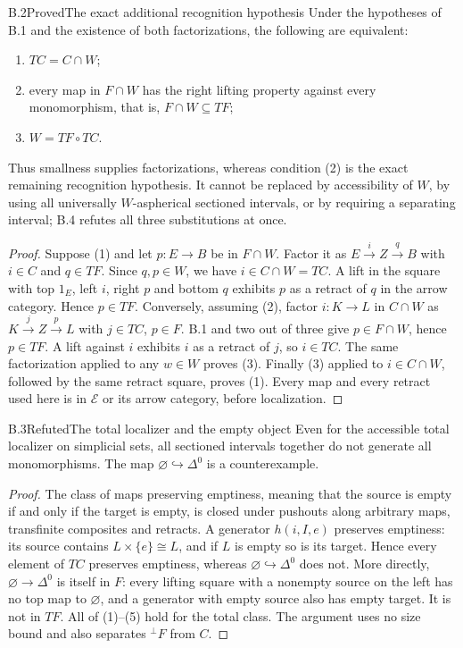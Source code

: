 \begin{claim}{B.2}{Proved}{The exact additional recognition hypothesis}\label{B2}
Under the hypotheses of B.1 and the existence of both factorizations, the
following are equivalent:
\begin{enumerate}
\item $TC=C\cap W$;
\item every map in $F\cap W$ has the right lifting property against every
monomorphism, that is, $F\cap W\subseteq TF$;
\item $W=TF\circ TC$.
\end{enumerate}
Thus smallness supplies factorizations, whereas condition (2) is the exact
remaining recognition hypothesis.  It cannot be replaced by accessibility
of $W$, by using all universally $W$-aspherical sectioned intervals, or by
requiring a separating interval; B.4 refutes all three substitutions at once.
\end{claim}
\begin{proof}
Suppose (1) and let $p:E\to B$ be in $F\cap W$.  Factor it as
$E\xrightarrow{i}Z\xrightarrow{q}B$ with $i\in C$ and $q\in TF$.
Since $q,p\in W$, we have $i\in C\cap W=TC$.
A lift in the square with top $1_E$, left $i$, right $p$ and bottom $q$
exhibits $p$ as a retract of $q$ in the arrow category.  Hence $p\in TF$.
Conversely, assuming (2), factor $i:K\to L$ in $C\cap W$ as
$K\xrightarrow{j}Z\xrightarrow{p}L$ with $j\in TC$, $p\in F$.
B.1 and two out of three give $p\in F\cap W$, hence $p\in TF$.
A lift against $i$ exhibits $i$ as a retract of $j$, so $i\in TC$.
The same factorization applied to any $w\in W$ proves (3).
Finally (3) applied to $i\in C\cap W$, followed by the same retract square,
proves (1).  Every map and every retract used here is in $\mathscr E$ or its
arrow category, before localization.
\end{proof}

\begin{claim}{B.3}{Refuted}{The total localizer and the empty object}\label{B3}
Even for the accessible total localizer on simplicial sets, all sectioned
intervals together do not generate all monomorphisms.  The map
$\varnothing\hookrightarrow\Delta^0$ is a counterexample.
\end{claim}
\begin{proof}
The class of maps preserving emptiness, meaning that the source is empty
if and only if the target is empty, is closed under pushouts along arbitrary
maps, transfinite composites and retracts.  A generator $h(i,I,e)$ preserves
emptiness: its source contains $L\times\{e\}\cong L$, and if $L$ is empty
so is its target.  Hence every element of $TC$ preserves emptiness, whereas
$\varnothing\hookrightarrow\Delta^0$ does not.  More directly,
$\varnothing\to\Delta^0$ is itself in $F$: every lifting square with a
nonempty source on the left has no top map to $\varnothing$, and a generator
with empty source also has empty target.  It is not in $TF$.
All of (1)--(5) hold for the total class.  The argument uses no size bound and
also separates ${}^{\perp}F$ from $C$.
\end{proof}

